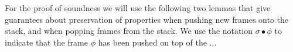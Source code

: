 %
% 
%
%
%
%
%

For the proof of soundness we will use the following two lemmas that give guarantees about preservation of properties when pushing new frames onto the stack, and when popping frames from the stack. We use the notation $\sigma \bullet \phi$ to indicate that the frame $\phi$ has been pushed on top of the ...

